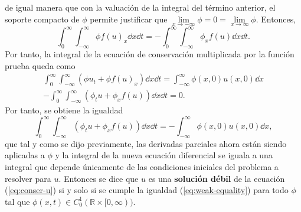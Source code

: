 de igual manera que con la valuación de la integral del término anterior, el soporte compacto de $\phi$ permite justificar que $\lim\limits_{x\rightarrow -\infty}\phi = 0 = \lim\limits_{x\rightarrow \infty}\phi$. Entonces,
\begin{equation}
	\int_{0}^{\infty}\int_{-\infty}^{\infty}  \phi f(u)_x \dd{x}\dd{t} =  -\int_{0}^{\infty}\int_{-\infty}^{\infty} \phi_x f(u) \dd{x}\dd{t}.
\end{equation}
Por tanto, la integral de la ecuación de conservación multiplicada por la función prueba queda como
\begin{equation}
\begin{aligned}
	\int_{0}^{\infty}\int_{-\infty}^{\infty}\left(\phi u_t + \phi f(u)_x\right) \dd{x}\dd{t} = \int_{-\infty}^{\infty} \phi(x,0)u(x,0) \dd{x} \\
	-\int_{0}^{\infty}\int_{-\infty}^{\infty}\left(\phi_t u + \phi_x f(u)\right) \dd{x}\dd{t} = 0.
\end{aligned}
\end{equation}
Por tanto, se obtiene la igualdad
\begin{equation}
	\int_{0}^{\infty}\int_{-\infty}^{\infty}\left(\phi_t u + \phi_x f(u)\right) \dd{x}\dd{t} = -\int_{-\infty}^{\infty} \phi(x,0)u(x,0) \dd{x},
	\label{eq:weak-equality}
\end{equation}
que tal y como se dijo previamente, las derivadas parciales ahora están siendo aplicadas a $\phi$ y la integral de la nueva ecuación diferencial se iguala a una integral que depende únicamente de las condiciones iniciales del problema a resolver para $u$. Entonces se dice que $u$ es una \textbf{solución débil} de la ecuación (\ref{eq:conser-u}) si y solo si se cumple la igualdad (\ref{eq:weak-equality}) para todo $\phi$ tal que $\phi(x,t) \in C_{0}^{1} (\mathbb{R} \times [0, \infty))$.

